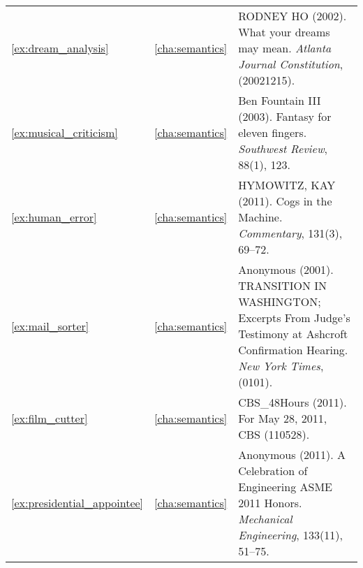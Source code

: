 \begin{longtable}{lcp{8.5cm}}
\ref{ex:dream_analysis}&\ref{cha:semantics}&RODNEY HO (2002). What your dreams may mean. \emph{Atlanta Journal Constitution}, (20021215). \\
\ref{ex:musical_criticism}&\ref{cha:semantics}&Ben Fountain III (2003). Fantasy for eleven fingers. \emph{Southwest Review}, 88(1), 123.\\
\ref{ex:human_error}&\ref{cha:semantics}&HYMOWITZ, KAY (2011). Cogs in the Machine. \emph{Commentary}, 131(3), 69--72.\\
\ref{ex:mail_sorter}&\ref{cha:semantics}&Anonymous (2001). TRANSITION IN WASHINGTON; Excerpts From Judge's Testimony at Ashcroft Confirmation Hearing. \emph{New York Times}, (0101).\\
\ref{ex:film_cutter}&\ref{cha:semantics}&CBS\_48Hours (2011). For May 28, 2011, CBS (110528).\\
\ref{ex:presidential_appointee}&\ref{cha:semantics}&Anonymous (2011). A Celebration of Engineering ASME 2011 Honors. \emph{Mechanical Engineering}, 133(11), 51--75.\\

\end{longtable}
